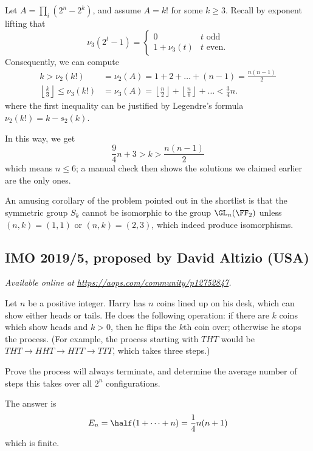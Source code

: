 \documentclass[11pt]{scrartcl}
\begin{document}
Let $A = \prod_i (2^n-2^k)$, and assume $A = k!$ for some $k \ge 3$.
Recall by exponent lifting that
\[ \nu_3(2^t-1) = \begin{cases}
    0 & t \text{ odd} \\
    1 + \nu_3(t) & t \text{ even}.
  \end{cases} \]
Consequently, we can compute
\begin{align*}
  k > \nu_2(k!) &= \nu_2(A) = 1 + 2 + \dots + (n-1) = \frac{n(n-1)}{2} \\
  \left\lfloor \frac k3 \right\rfloor
    \le \nu_3(k!) &= \nu_3(A) = \left\lfloor \frac n2 \right\rfloor
    + \left\lfloor \frac n6 \right\rfloor + \dots < \frac 34n.
\end{align*}
where the first inequality can be justified
by Legendre's formula $\nu_2(k!) = k - s_2(k)$.

In this way, we get
\[ \frac 94 n + 3 > k > \frac{n(n-1)}{2} \]
which means $n \le 6$; a manual check then shows the
solutions we claimed earlier are the only ones.

\begin{remark*}
  An amusing corollary of the problem pointed out in the shortlist
  is that the symmetric group $S_k$ cannot be isomorphic to the group $\GL_n(\FF_2)$
  unless $(n,k) = (1,1)$ or $(n,k) = (2,3)$, which indeed produce isomorphisms.
\end{remark*}
\pagebreak

\subsection{IMO 2019/5, proposed by David Altizio (USA)}
\textsl{Available online at \url{https://aops.com/community/p12752847}.}
\begin{mdframed}[style=mdpurplebox,frametitle={Problem statement}]
Let $n$ be a positive integer.
Harry has $n$ coins lined up on his desk,
which can show either heads or tails.
He does the following operation:
if there are $k$ coins which show heads and $k > 0$,
then he flips the $k$th coin over;
otherwise he stops the process.
(For example, the process starting with $THT$ would be
$THT \to HHT \to HTT \to TTT$, which takes three steps.)

Prove the process will always terminate,
and determine the average number of steps
this takes over all $2^n$ configurations.
\end{mdframed}
The answer is \[ E_n = \half (1 + \dots + n) = \frac14 n(n+1) \]
which is finite.
\end{document}
